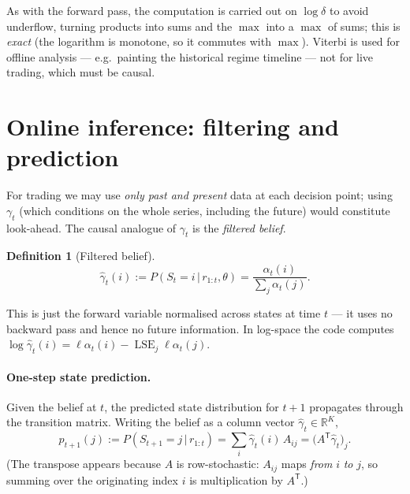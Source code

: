 \documentclass[11pt]{article}
\newcommand{\R}{\mathbb{R}}
\newcommand{\Tr}{^{\mathsf{T}}}              %
\newcommand{\given}{\,\vert\,}
\newcommand{\eqdef}{:=}
\newcommand{\state}{S}
\newcommand{\obs}{r}
\newcommand{\nstate}{K}
\newcommand{\fwd}{\alpha}
\theoremstyle{plain}
\theoremstyle{definition}
\newtheorem{definition}{Definition}
\theoremstyle{remark}
\begin{document}
As with the forward pass, the computation is carried out on $\log\delta$ to avoid
underflow, turning products into sums and the $\max$ into a $\max$ of sums; this
is \emph{exact} (the logarithm is monotone, so it commutes with $\max$). Viterbi
is used for offline analysis --- e.g.\ painting the historical regime timeline ---
not for live trading, which must be causal.

\section{Online inference: filtering and prediction}\label{sec:filtering}

For trading we may use \emph{only past and present} data at each decision point;
using $\gamma_t$ (which conditions on the whole series, including the future)
would constitute look-ahead. The causal analogue of $\gamma_t$ is the
\emph{filtered belief}.

\begin{definition}[Filtered belief]
\begin{equation}
  \hat\gamma_t(i) \eqdef P(\state_t=i\given\obs_{1:t},\theta)
  = \frac{\fwd_t(i)}{\sum_{j}\fwd_t(j)} .
\end{equation}
\end{definition}
This is just the forward variable normalised across states at time $t$ --- it uses
no backward pass and hence no future information. In log-space the code computes
$\log\hat\gamma_t(i)=\ell\fwd_t(i)-\operatorname{LSE}_j\ell\fwd_t(j)$.

\paragraph{One-step state prediction.}
Given the belief at $t$, the predicted state distribution for $t+1$ propagates
through the transition matrix. Writing the belief as a column vector
$\hat\gamma_t\in\R^{\nstate}$,
\begin{equation}\label{eq:predict-state}
  p_{t+1}(j) \eqdef P(\state_{t+1}=j\given\obs_{1:t})
  = \sum_i \hat\gamma_t(i)\,A_{ij}
  = \big(A\Tr \hat\gamma_t\big)_j .
\end{equation}
(The transpose appears because $A$ is row-stochastic: $A_{ij}$ maps \emph{from}
$i$ \emph{to} $j$, so summing over the originating index $i$ is multiplication by
$A\Tr$.)
\end{document}
